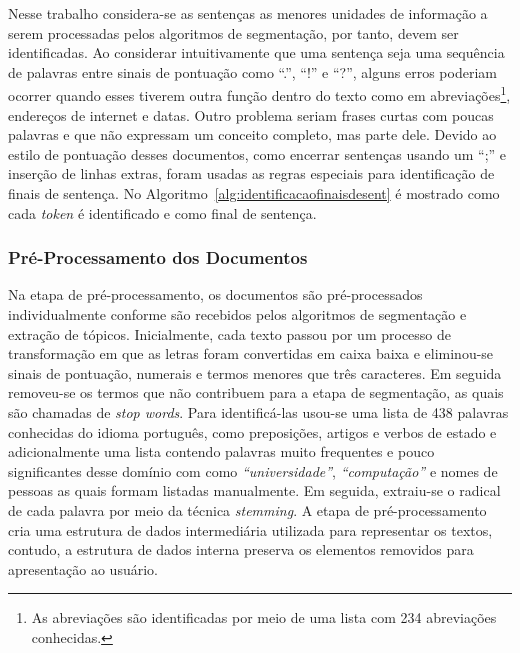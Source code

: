 Nesse trabalho considera-se as sentenças as menores unidades de informação a serem processadas pelos algoritmos de segmentação, por tanto, devem ser identificadas. Ao considerar intuitivamente que uma sentença seja uma sequência de palavras entre sinais de pontuação como ``.'', ``!'' e ``?'', alguns erros poderiam ocorrer quando esses tiverem outra função dentro do texto como em abreviações\footnote{As abreviações são identificadas por meio de uma lista com 234 abreviações conhecidas.}, endereços de internet e datas. Outro problema seriam frases curtas com poucas palavras e que não expressam um conceito completo, mas parte dele. Devido ao estilo de pontuação desses documentos, como encerrar sentenças usando um ``;'' e inserção de linhas extras, foram usadas as regras especiais para identificação de finais de sentença. No Algoritmo~\ref{alg:identificacaofinaisdesent} é mostrado como cada \textit{token} é identificado e como final de sentença.  %







\subsubsection{Pré-Processamento dos Documentos}



Na etapa de pré-processamento, os documentos são pré-processados individualmente conforme são recebidos pelos algoritmos de segmentação e extração de tópicos. Inicialmente, cada texto passou por um processo de transformação em que as letras foram convertidas em caixa baixa e eliminou-se sinais de pontuação, numerais e termos menores que três caracteres. Em seguida removeu-se os termos que não contribuem para a etapa de segmentação, as quais são chamadas de \textit{stop words}. Para identificá-las usou-se uma lista de 438 palavras conhecidas do idioma português, como preposições, artigos e verbos de estado e adicionalmente uma lista contendo palavras muito frequentes e pouco significantes desse domínio com como \textit{``universidade''}, \textit{``computação''} e nomes de pessoas as quais formam listadas manualmente. Em seguida, extraiu-se o radical de cada palavra por meio da técnica \textit{stemming}. A etapa de pré-processamento cria uma estrutura de dados intermediária utilizada para representar os textos, contudo, a estrutura de dados interna preserva os elementos removidos para apresentação ao usuário.

